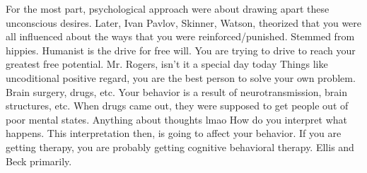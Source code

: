 \markdownRendererUlItem For the most part, psychological approach were about drawing apart these unconscious desires.\markdownRendererUlItemEnd 
\markdownRendererUlEndTight \markdownRendererInterblockSeparator
{}\markdownRendererInterblockSeparator
{}\markdownRendererUlBeginTight
\markdownRendererUlItem Later, Ivan Pavlov, Skinner, Watson, theorized that you were all influenced about the ways that you were reinforced/punished.\markdownRendererUlItemEnd 
\markdownRendererUlEndTight \markdownRendererInterblockSeparator
{}\markdownRendererInterblockSeparator
{}\markdownRendererUlBeginTight
\markdownRendererUlItem Stemmed from hippies.\markdownRendererUlItemEnd 
\markdownRendererUlItem Humanist is the drive for free will.\markdownRendererUlItemEnd 
\markdownRendererUlItem You are trying to drive to reach your greatest free potential.\markdownRendererUlItemEnd 
\markdownRendererUlEndTight \markdownRendererInterblockSeparator
{}\markdownRendererBlockQuoteBegin
Mr. Rogers, isn't it a special day today
\markdownRendererBlockQuoteEnd \markdownRendererInterblockSeparator
{}\markdownRendererUlBeginTight
\markdownRendererUlItem Things like uncoditional positive regard, you are the best person to solve your own problem.\markdownRendererUlItemEnd 
\markdownRendererUlEndTight \markdownRendererInterblockSeparator
{}\markdownRendererInterblockSeparator
{}\markdownRendererUlBeginTight
\markdownRendererUlItem Brain surgery, drugs, etc.\markdownRendererUlItemEnd 
\markdownRendererUlItem Your behavior is a result of neurotransmission, brain structures, etc.\markdownRendererUlItemEnd 
\markdownRendererUlItem When drugs came out, they were supposed to get people out of poor mental states.\markdownRendererUlItemEnd 
\markdownRendererUlEndTight \markdownRendererInterblockSeparator
{}\markdownRendererInterblockSeparator
{}\markdownRendererUlBeginTight
\markdownRendererUlItem Anything about thoughts lmao\markdownRendererUlItemEnd 
\markdownRendererUlItem How do you interpret what happens.\markdownRendererUlItemEnd 
\markdownRendererUlItem This interpretation then, is going to affect your behavior. If you are getting therapy, you are probably getting cognitive behavioral therapy.\markdownRendererUlItemEnd 
\markdownRendererUlItem Ellis and Beck primarily.\markdownRendererUlItemEnd 
\markdownRendererUlEndTight \markdownRendererInterblockSeparator
{}\markdownRendererInterblockSeparator
